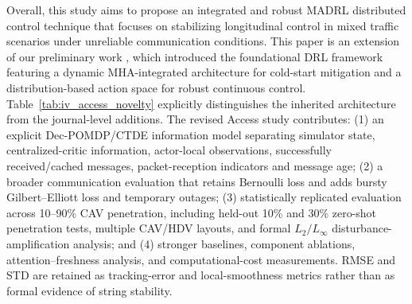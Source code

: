 \documentclass{ieeeaccess}
\begin{document}
Overall, this study aims to propose an integrated and robust MADRL distributed control technique that focuses on stabilizing longitudinal control in mixed traffic scenarios under unreliable communication conditions. This paper is an extension of our preliminary work \cite{cai2026integrating}, which introduced the foundational DRL framework featuring a dynamic MHA-integrated architecture for cold-start mitigation and a distribution-based action space for robust continuous control. Table~\ref{tab:iv_access_novelty} explicitly distinguishes the inherited architecture from the journal-level additions. The revised Access study contributes: (1) an explicit Dec-POMDP/CTDE information model separating simulator state, centralized-critic information, actor-local observations, successfully received/cached messages, packet-reception indicators and message age; (2) a broader communication evaluation that retains Bernoulli loss and adds bursty Gilbert--Elliott loss and temporary outages; (3) statistically replicated evaluation across 10--90\% CAV penetration, including held-out 10\% and 30\% zero-shot penetration tests, multiple CAV/HDV layouts, and formal $L_2/L_\infty$ disturbance-amplification analysis; and (4) stronger baselines, component ablations, attention--freshness analysis, and computational-cost measurements. RMSE and STD are retained as tracking-error and local-smoothness metrics rather than as formal evidence of string stability.
\end{document}

